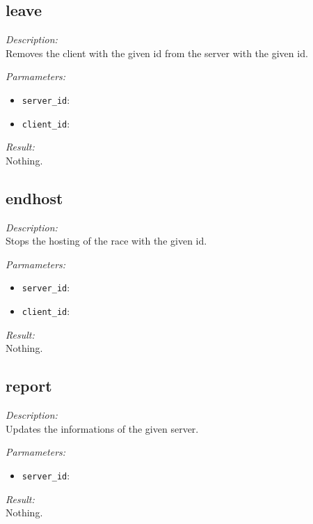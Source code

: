 \subsection{leave}

\begin{description}
\item {\it Description:}\\
Removes the client with the given id from the server with the given id.
\item {\it Parmameters:}
\begin{itemize}
\item {\tt server\_id}: 
\item {\tt client\_id}: 
\end{itemize}
\item {\it Result:}\\
Nothing.
\end{description}

\subsection{endhost}

\begin{description}
\item {\it Description:}\\
Stops the hosting of the race with the given id.
\item {\it Parmameters:}
\begin{itemize}
\item {\tt server\_id}: 
\item {\tt client\_id}: 
\end{itemize}
\item {\it Result:}\\
Nothing.
\end{description}

\subsection{report}

\begin{description}
\item {\it Description:}\\
Updates the informations of the given server.
\item {\it Parmameters:}
\begin{itemize}
\item {\tt server\_id}: 
\end{itemize}
\item {\it Result:}\\
Nothing.
\end{description}

